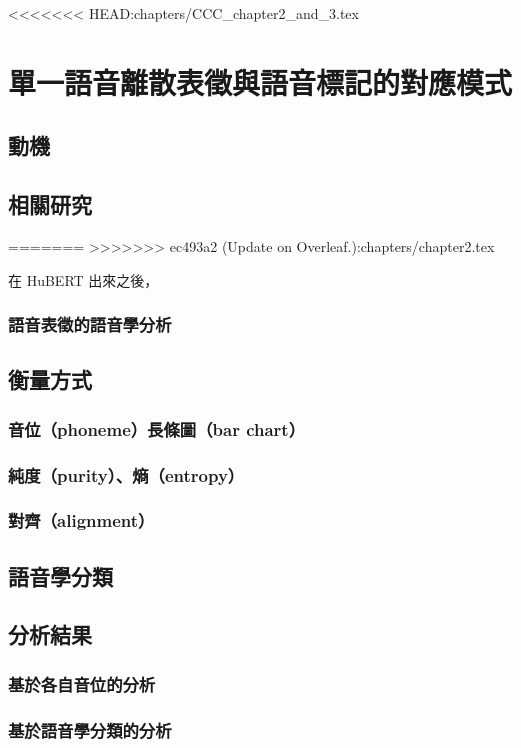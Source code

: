 <<<<<<< HEAD:chapters/CCC_chapter2_and_3.tex
\chapter{
    單一語音離散表徵與語音標記的對應模式}
\section{動機}  %
\section{相關研究}
=======
>>>>>>> ec493a2 (Update on Overleaf.):chapters/chapter2.tex

在 HuBERT 出來之後，

\subsection{語音表徵的語音學分析}
\section{衡量方式}
\subsection{音位（phoneme）長條圖（bar chart）}
\subsection{純度（purity）、熵（entropy）}
\subsection{對齊（alignment）}
\section{語音學分類}
\section{分析結果}
\subsection{基於各自音位的分析}
\subsection{基於語音學分類的分析}
